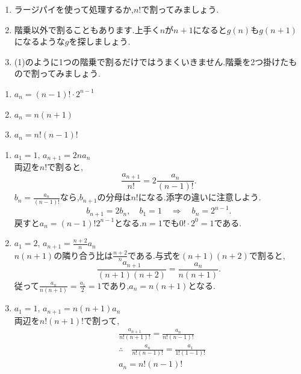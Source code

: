   \noindent{}\par\nobreak
  \begin{enumerate}[label=(\arabic*),parsep=3pt,format=\bookitemlink{example-ratio-1}{hint}{answer}]
    \item ラージパイを使って処理するか,$n!$で割ってみましょう.
    \item 階乗以外で割ることもあります.上手く$n$が$n+1$になると$g(n)$も$g(n+1)$になるような$g$を探しましょう.
    \item (1)のように1つの階乗で割るだけではうまくいきません.階乗を2つ掛けたもので割ってみましょう.
  \end{enumerate}
  
  \noindent{}\par\nobreak
  \begin{enumerate}[label=(\arabic*),parsep=3pt,format=\bookitemlink{example-ratio-1}{answer}{solution}]
    \item $a_n=(n-1)!\cdot 2^{n-1}$
    \item $a_n=n(n+1)$
    \item $a_n=n!(n-1)!$
  \end{enumerate}
  
  \noindent{}\par\nobreak
  \begin{enumerate}[label=(\arabic*),parsep=3pt,format=\bookitemlink{example-ratio-1}{solution}{problem}]
    \item $a_1=1,\, a_{n+1}=2na_n$\\
      両辺を$n!$で割ると,
      \[
        \frac{a_{n+1}}{n!}=2\frac{a_n}{(n-1)!}.
      \]
      $b_n=\frac{a_n}{(n-1)!}$なら,$b_{n+1}$の分母は$n!$になる.添字の違いに注意しよう.
      \[
        b_{n+1}=2b_n,\quad b_1=1\quad\Longrightarrow\quad b_n=2^{n-1}.
      \]
      戻すと$a_n=(n-1)!2^{n-1}$となる.$n=1$でも$0!\cdot2^0=1$である.
  
    \item $a_1=2,\, a_{n+1}=\frac{n+2}{n}a_n$\\
      $n(n+1)$の隣り合う比は$\frac{n+2}{n}$である.与式を$(n+1)(n+2)$で割ると,
      \[
        \frac{a_{n+1}}{(n+1)(n+2)}=\frac{a_n}{n(n+1)}.
      \]
      従って$\frac{a_n}{n(n+1)}=\frac{a_1}{2}=1$であり,$a_n=n(n+1)$となる.
    \item $a_1=1,\, a_{n+1}=n(n+1)a_n$\\
      両辺を$n!(n+1)!$で割って,
      \begin{align*}
        &\frac{a_{n+1}}{n!(n+1)!}=\frac{a_n}{n!(n-1)!}\\
        &\therefore \quad \frac{a_n}{n!(n-1)!}=\frac{a_1}{1!(1-1)!}\\
        &a_n=n!(n-1)!
      \end{align*}
  \end{enumerate}
